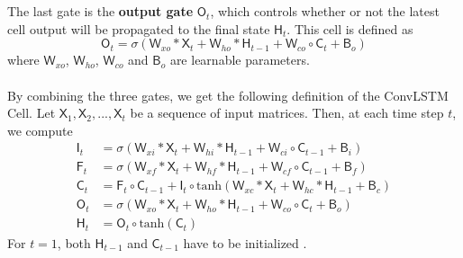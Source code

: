 \documentclass[./main.tex]{subfiles}
\begin{document}
\\
\\
The last gate is the \textbf{output gate} $\mathsf{O}_t$, which controls whether or not the latest cell output will be propagated to the final state $\mathsf{H}_t$. This cell is defined as
\begin{equation}
    \mathsf{O}_t = \sigma \left( \mathsf{W}_{xo} * \mathsf{X}_t + \mathsf{W}_{ho} * \mathsf{H}_{t - 1} + \mathsf{W}_{co} \circ \mathsf{C}_t + \mathsf{B}_o \right)
\end{equation}
where $\mathsf{W}_{xo}$, $\mathsf{W}_{ho}$, $\mathsf{W}_{co}$ and $\mathsf{B}_o$ are learnable parameters.
\\
\\
By combining the three gates, we get the following definition of the ConvLSTM Cell.
Let $\mathsf{X}_1, \mathsf{X}_2, ..., \mathsf{X}_t$ be a sequence of input matrices. Then, at each time step $t$, we compute
\begin{align}
    \mathsf{I}_t &= \sigma \left( \mathsf{W}_{xi} * \mathsf{X}_t + \mathsf{W}_{hi} * \mathsf{H}_{t - 1} + \mathsf{W}_{ci} \circ \mathsf{C}_{t - 1} + \mathsf{B}_i \right) \\
    \mathsf{F}_t &= \sigma \left( \mathsf{W}_{xf} * \mathsf{X}_t + \mathsf{W}_{hf} * \mathsf{H}_{t - 1} + \mathsf{W}_{cf} \circ \mathsf{C}_{t - 1} + \mathsf{B}_f \right) \\
    \mathsf{C}_t &= \mathsf{F}_t \circ \mathsf{C}_{t - 1} + \mathsf{I}_t \circ \text{tanh} \left( \mathsf{W}_{xc} * \mathsf{X}_t + \mathsf{W}_{hc} * \mathsf{H}_{t - 1} + \mathsf{B}_c \right) \\
    \mathsf{O}_t &= \sigma \left( \mathsf{W}_{xo} * \mathsf{X}_t + \mathsf{W}_{ho} * \mathsf{H}_{t - 1} + \mathsf{W}_{co} \circ \mathsf{C}_t + \mathsf{B}_o \right) \\
    \mathsf{H}_t &= \mathsf{O}_t \circ \text{tanh}(\mathsf{C}_t)
\end{align}
For $t = 1$, both $\mathsf{H}_{t - 1}$ and $\mathsf{C}_{t - 1}$ have to be initialized \cite{conv_lstm}.
\end{document}

